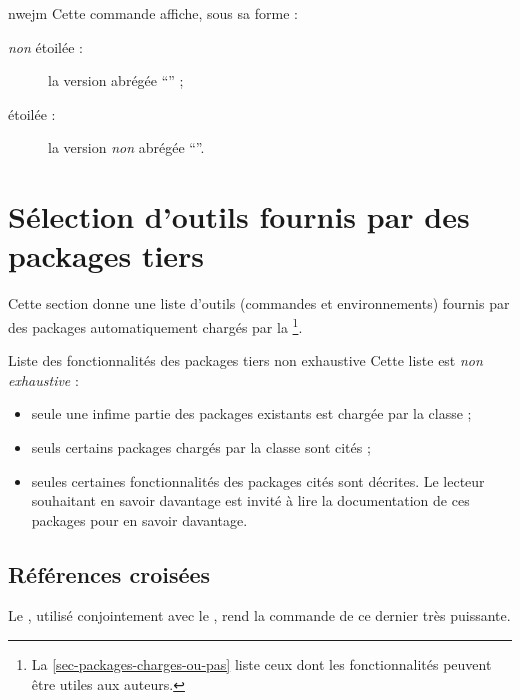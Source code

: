 \begin{docCommand}{nwejm}{}
  Cette commande affiche, sous sa forme :
  \begin{description}
  \item[\emph{non} étoilée :] la version abrégée \enquote{\nwejm} ;
  \item[étoilée :] la version \emph{non} abrégée \enquote{\nwejm*}.
  \end{description}
\end{docCommand}

\section{Sélection d'outils fournis par des packages tiers}

Cette section donne une liste d'outils (commandes et environnements) fournis par
des packages automatiquement chargés par la \nwejmauthorcl\footnote{La
  \vref{sec-packages-charges-ou-pas} liste ceux dont les fonctionnalités peuvent
  être utiles aux auteurs.}.

\begin{dbwarning}{Liste des fonctionnalités des packages tiers non exhaustive}{}
  Cette liste est \emph{non exhaustive} :
  \begin{itemize}
  \item seule une infime partie des packages existants est chargée par la
    classe ;
  \item seuls certains packages chargés par la classe sont cités ;
  \item seules certaines fonctionnalités des packages cités sont décrites. Le
    lecteur souhaitant en savoir davantage est invité à lire la documentation de
    ces packages pour en savoir davantage.
  \end{itemize}
\end{dbwarning}

\subsection{Références croisées}
\label{sec-references-croisees}

Le , utilisé conjointement avec le , rend la
commande  de ce dernier très puissante.

